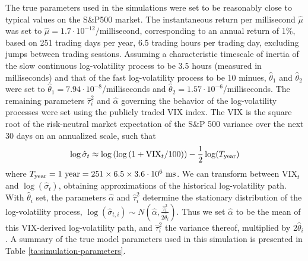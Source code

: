 \documentclass[10pt]{article}
\newcommand{\htheta}{\hat{\theta}}
\newcommand{\halpha}{\hat{\alpha}}
\newcommand{\hmu}{\hat{\mu}}
\newcommand{\hsigma}{\hat{\sigma}}
\newcommand{\htau}{\hat{\tau}}
\begin{document}
The true parameters used in the simulations were set to be reasonably close to typical values on the S\&P500 market. The instantaneous return per millisecond $\hmu$ was set to $\hmu = 1.7 \cdot 10^{-12}/\mbox{millisecond}$, corresponding to an annual return of 1\%, based on 251 trading days per year, 6.5 trading hours per trading day, excluding jumps between trading sessions. Assuming a characteristic timescale of inertia of the slow continuous log-volatility process to be 3.5 hours (measured in milliseconds) and that of the fast log-volatility process to be 10 minues, $\htheta_1$ and $\htheta_2$ were set to $\htheta_1 = 7.94\cdot 10^{-8}$/milliseconds and $\htheta_2 = 1.57\cdot 10^{-6}$/milliseconds. The remaining parameters $\htau_i^2$ and $\halpha$ governing the behavior of the log-volatility processes were set using the publicly traded VIX index. The VIX is the square root of the risk-neutral market expectation of the S\&P 500 variance over the next 30 days on an annualized scale, such that
$$
\log \hsigma_t \approx \log\left( \log\left(1 + \mbox{VIX}_t / 100 \right) \right) - \frac{1}{2} \log(T_{\rm year})
$$
where $T_{\rm year} = 1 \mbox{ year} = 251 \times 6.5 \times 3.6 \cdot 10^6 \mbox{ ms}$. We can transform between $\mbox{VIX}_t$ and $\log(\hsigma_t)$, obtaining approximations of the historical log-volatility path. With $\htheta_i$ set, the parameters $\halpha$ and $\htau_i^2$ determine the stationary distribution of the log-volatility process, $\log(\hsigma_{t,i}) \sim N\left(\halpha, \frac{\htau_i^2}{2\htheta_i}\right)$.  Thus we set $\halpha$ to be the mean of this VIX-derived log-volatility path, and $\htau_i^2$ the variance thereof, multiplied by $2\htheta_i$.  A summary of the true model parameters used in this simulation is presented in Table \ref{ta:simulation-parameters}.
\end{document}
